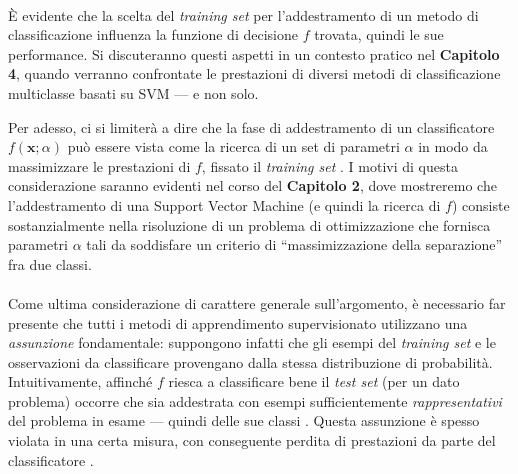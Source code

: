 \paragraph{}
È evidente che la scelta del \textit{training set} per l'addestramento di un metodo di classificazione influenza la funzione di decisione $f$ trovata, quindi le sue performance.
Si discuteranno questi aspetti in un contesto pratico nel \textbf{Capitolo 4}, quando verranno confrontate le prestazioni di diversi metodi di classificazione multiclasse basati su SVM --- e non solo.

Per adesso, ci si limiterà a dire che la fase di addestramento di un classificatore $f(\boldsymbol{x}; \alpha)$ può essere vista come la ricerca di un set di parametri $\alpha$ in modo da massimizzare le prestazioni di $f$, fissato il \textit{training set} \cite{tutorial}. I motivi di questa considerazione saranno evidenti nel corso del \textbf{Capitolo 2}, dove mostreremo che l'addestramento di una Support Vector Machine (e quindi la ricerca di $f$) consiste sostanzialmente nella risoluzione di un problema di ottimizzazione che fornisca parametri $\alpha$ tali da soddisfare un criterio di ``massimizzazione della separazione'' fra due classi.
	
\paragraph{}
Come ultima considerazione di carattere generale sull'argomento, è necessario far presente che tutti i metodi di apprendimento supervisionato utilizzano una \textit{assunzione} fondamentale: suppongono infatti che gli esempi del \textit{training set} e le osservazioni da classificare provengano dalla stessa distribuzione di probabilità. Intuitivamente, affinché $f$ riesca a classificare bene il \textit{test set} (per un dato problema) occorre che sia addestrata con esempi sufficientemente \textit{rappresentativi} del problema in esame --- quindi delle sue classi \cite{mitchell97}.
Questa assunzione è spesso violata in una certa misura, con conseguente perdita di prestazioni da parte del classificatore
\cite{bing2011}.
	

%
	